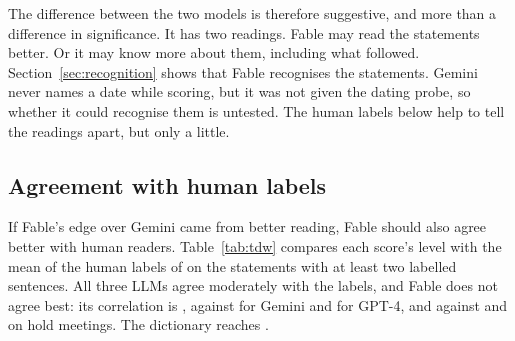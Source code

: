 \begin{table}[t]
\centering
\caption{Fable against Gemini, hold meetings}\label{tab:gemini}
\small

\end{table}

The difference between the two models is therefore suggestive, and more than a difference in
significance. It has two readings. Fable may read the statements better. Or it may know more about them,
including what followed. Section~\ref{sec:recognition} shows that Fable recognises the statements.
Gemini never names a date while scoring, but it was not given the dating probe, so whether it could
recognise them is untested. The human labels below help to tell the readings apart, but only a little.

\subsection{Agreement with human labels}

\begin{table}[t]
\centering
\caption{Correlation of score levels with published human sentence labels}\label{tab:tdw}
\small

\end{table}

If Fable's edge over Gemini came from better reading, Fable should also agree better with human readers.
Table~\ref{tab:tdw} compares each score's level with the mean of the human labels of \citet{shah2023} on
the  statements with at least two labelled sentences. All three LLMs agree moderately with the
labels, and Fable does not agree best: its correlation is , against  for
Gemini and  for GPT-4, and  against  and
 on hold meetings. The dictionary reaches .


